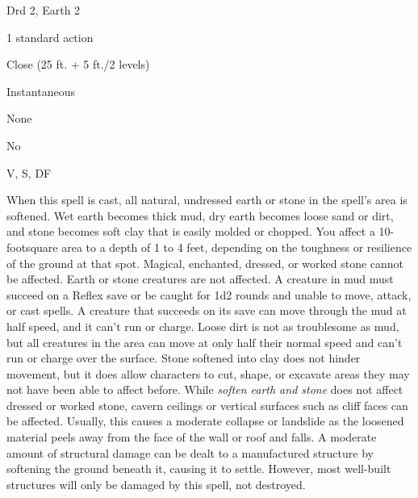 
\begin{description*}
\item[Level:] Drd 2, Earth 2
\item[Casting Time:] 1 standard action
\item[Range:] Close (25 ft. + 5 ft./2 levels)
\item[Duration:] Instantaneous
\item[Saving Throw:] None
\item[Spell Resistance:] No
\item[Components:] V, S, DF
\end{description*}

When this spell is cast, all natural, undressed earth or stone in the spell's area
is softened. Wet earth becomes thick mud, dry earth becomes loose sand or dirt,
and stone becomes soft clay that is easily molded or chopped. You affect a 10-footsquare
area to a depth of 1 to 4 feet, depending on the toughness or resilience of the
ground at that spot. Magical, enchanted, dressed, or worked stone cannot be affected.
Earth or stone creatures are not affected.
A creature in mud must succeed on a Reflex save or be caught for 1d2 rounds and
unable to move, attack, or cast spells. A creature that succeeds on its save can
move through the mud at half speed, and it can't run or charge.
Loose dirt is not as troublesome as mud, but all creatures in the area can move
at only half their normal speed and can't run or charge over the surface.
Stone softened into clay does not hinder movement, but it does allow characters
to cut, shape, or excavate areas they may not have been able to affect before.
While \textit{soften earth and stone} does not affect dressed or worked stone,
cavern ceilings or vertical surfaces such as cliff faces can be affected. Usually,
this causes a moderate collapse or landslide as the loosened material peels away
from the face of the wall or roof and falls.
A moderate amount of structural damage can be dealt to a manufactured structure
by softening the ground beneath it, causing it to settle. However, most well-built
structures will only be damaged by this spell, not destroyed.